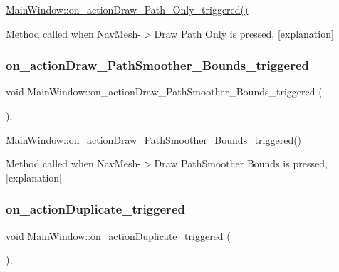 \hyperlink{class_main_window_aa53ce2c98696444f4508a566b42e1c93}{Main\+Window\+::on\+\_\+action\+Draw\+\_\+\+Path\+\_\+\+Only\+\_\+triggered()} 

Method called when Nav\+Mesh-\/$>$Draw Path Only is pressed, \mbox{[}explanation\mbox{]} \mbox{\label{class_main_window_a7330dbe2178ee265a4b88c11d7c6f566}} 
\subsubsection{\texorpdfstring{on\+\_\+action\+Draw\+\_\+\+Path\+Smoother\+\_\+\+Bounds\+\_\+triggered}{on\_actionDraw\_PathSmoother\_Bounds\_triggered}}
{\footnotesize\ttfamily void Main\+Window\+::on\+\_\+action\+Draw\+\_\+\+Path\+Smoother\+\_\+\+Bounds\+\_\+triggered (\begin{DoxyParamCaption}{ }\end{DoxyParamCaption})\hspace{0.3cm}{\ttfamily [private]}, {\ttfamily [slot]}}



\hyperlink{class_main_window_a7330dbe2178ee265a4b88c11d7c6f566}{Main\+Window\+::on\+\_\+action\+Draw\+\_\+\+Path\+Smoother\+\_\+\+Bounds\+\_\+triggered()} 

Method called when Nav\+Mesh-\/$>$Draw Path\+Smoother Bounds is pressed, \mbox{[}explanation\mbox{]} \mbox{\label{class_main_window_af5060bd55fe1e9a7196be8a2dab1622e}} 
\subsubsection{\texorpdfstring{on\+\_\+action\+Duplicate\+\_\+triggered}{on\_actionDuplicate\_triggered}}
{\footnotesize\ttfamily void Main\+Window\+::on\+\_\+action\+Duplicate\+\_\+triggered (\begin{DoxyParamCaption}{ }\end{DoxyParamCaption})\hspace{0.3cm}{\ttfamily [private]}, {\ttfamily [slot]}}



